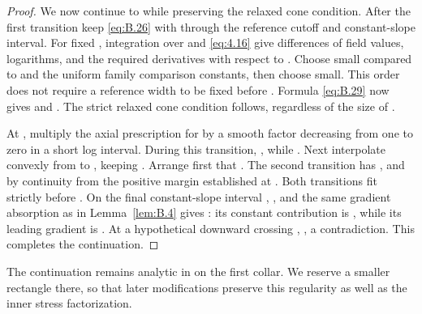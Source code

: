\begin{proof}
We now continue to  while preserving the relaxed cone condition. After the first
transition keep \eqref{eq:B.26} with  through the reference cutoff and constant-slope interval.
For fixed , integration over  and \eqref{eq:4.16} give
 differences of field values, logarithms, and the required derivatives with respect to
. Choose  small compared to
 and the uniform family comparison constants, then choose
 small. This order does not require a reference width to be fixed before
. Formula \eqref{eq:B.29} now gives
 and . The strict relaxed cone condition follows,
regardless of the size of .

At , multiply the axial prescription for  by a smooth factor
 decreasing from one to zero in a short log interval. During this transition,
, while
. Next interpolate  convexly from
 to , keeping
. Arrange first that
. The second transition has
, and  by continuity from
the positive margin established at . Both transitions fit strictly before
. On the final constant-slope interval
, , and the same gradient absorption as in Lemma~\ref{lem:B.4}
gives : its constant contribution is
, while its leading gradient is
. At a hypothetical downward crossing
,
, a contradiction. This completes the continuation.
\end{proof}

The continuation remains analytic in  on the first collar. We reserve a smaller rectangle
there, so that later modifications preserve this regularity as well as the inner stress factorization.

